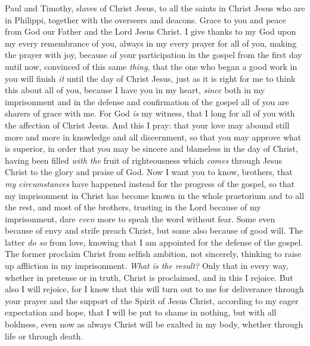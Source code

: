 
\begin{biblechapter} %
 Paul and Timothy, slaves of Christ Jesus, to all the saints in Christ Jesus who are in Philippi, together with the overseers and deacons.
\verse Grace to you and peace from God our Father and the Lord Jesus Christ.
 I give thanks to my God upon my every remembrance of you,
\verse always in my every prayer for all of you, making the prayer with joy,
\verse because of your participation in the gospel from the first day until now,
\verse convinced of this same \textit{thing}, that the one who began a good work in you will finish \textit{it} until the day of Christ Jesus,
\verse just as it is right for me to think this about all of you, because I have you in my heart, \textit{since} both in my imprisonment and in the defense and confirmation of the gospel all of you are sharers of grace with me.
\verse For God \textit{is} my witness, that I long for all of you with the affection of Christ Jesus.
 And this I pray: that your love may abound still more and more in knowledge and all discernment,
\verse so that you may approve what is superior, in order that you may be sincere and blameless in the day of Christ,
\verse having been filled \textit{with the} fruit of righteousness which \textit{comes} through Jesus Christ to the glory and praise of God.
 Now I want you to know, brothers, that \textit{my circumstances} have happened instead for the progress of the gospel,
\verse so that my imprisonment in Christ has become known in the whole praetorium and to all the rest,
\verse and most of the brothers, trusting in the Lord because of my imprisonment, dare \textit{even} more to speak the word without fear.
\verse Some even because of envy and strife preach Christ, but some also because of good will.
\verse The latter \textit{do so} from love, knowing that I am appointed for the defense of the gospel.
\verse The former proclaim Christ from selfish ambition, not sincerely, thinking to raise up affliction in my imprisonment.
\verse \textit{What is the result?} Only that in every way, whether in pretense or in truth, Christ is proclaimed, and in this I rejoice. But also I will rejoice,
\verse for I know that this will turn out to me for deliverance through your prayer and the support of the Spirit of Jesus Christ,
\verse according to my eager expectation and hope, that I will be put to shame in nothing, but with all boldness, even now as always Christ will be exalted in my body, whether through life or through death.

\end{biblechapter}
